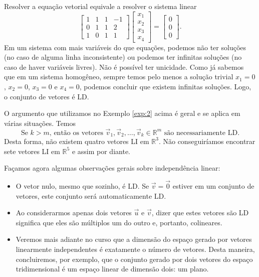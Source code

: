 \begin{ex}
Resolver a equação vetorial equivale a resolver o sistema linear
\begin{equation}
\left[
  \begin{array}{cccc}
    1 & 1 & 1 & -1 \\
    0 & 1 & 1 & 2  \\
    1 & 0 & 1 & 1
  \end{array}
\right]
\left[
  \begin{array}{c}
    x_1 \\
    x_2 \\
    x_3 \\
    x_4
  \end{array}
\right] =
\left[
  \begin{array}{c}
    0 \\
    0 \\
    0
  \end{array}
\right].
\end{equation} Em um sistema com mais variáveis do que equações, podemos não ter soluções (no caso de alguma linha inconsistente) ou podemos ter infinitas soluções (no caso de haver variáveis livres). Não é possível ter unicidade. Como já sabemos que em um sistema homogêneo, sempre temos pelo menos a solução trivial $x_1 = 0$, $x_2=0$, $x_3=0$ e $x_4 = 0$, podemos concluir que existem infinitas soluções. Logo, o conjunto de vetores é LD.
\end{ex}

O argumento que utilizamos no Exemplo \ref{exp:2} acima é geral e se aplica em várias situações. Temos
\begin{equation}
\boxed{\text{Se $k>m$, então os vetores } \vec{v}_1, \vec{v}_2, \dots, \vec{v}_k  \in \mathbb{R}^m \text{ são necessariamente LD.}}
\end{equation} Desta forma, não existem quatro vetores LI em $\mathbb{R}^3$. Não conseguiríamos encontrar sete vetores LI em $\mathbb{R}^5$ e assim por diante.


Façamos agora algumas observações gerais sobre independência linear:
\begin{itemize}
  \item O vetor nulo, mesmo que sozinho, é LD. Se $\vec{v} = \vec{0}$ estiver em um conjunto de vetores, este conjunto será automaticamente LD.
  \item Ao considerarmos apenas dois vetores $\vec{u}$ e $\vec{v}$, dizer que estes vetores são LD significa que eles são múltiplos um do outro e, portanto, colineares.
  \item Veremos mais adiante no curso que a dimensão do espaço gerado por vetores linearmente independentes é exatamente o número de vetores. Desta maneira, concluiremos, por exemplo, que o conjunto gerado por dois vetores do espaço tridimensional é um espaço linear de dimensão dois: um plano.
\end{itemize}

